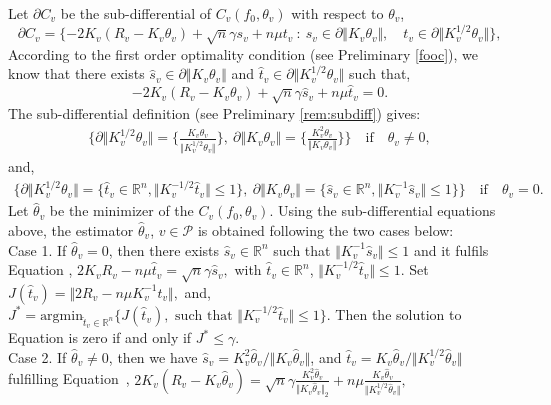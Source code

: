 Let $\partial C_{v}$ be the sub-differential of $C_{v}(f_0,\theta_v)$ with respect to $\theta_v$,
\begin{equation*}
\partial C_v=\{-2K_v(R_v-K_v\theta_v)+\sqrt{n}\gamma s_v+n\mu t_v\: :\: s_v\in\partial\Vert K_v\theta_v\Vert,\quad t_v\in\partial\Vert K_v^{1/2}\theta_v\Vert\},
\end{equation*} 
According to the first order optimality condition (see Preliminary \ref{fooc}), we know that there exists $\widehat{s}_v\in\partial\Vert K_v\theta_v\Vert$ and $\widehat{t}_v\in\partial\Vert K_v^{1/2}\theta_v\Vert$ such that, 
\begin{equation}
\label{foprgs}
-2K_v(R_v-K_v\theta_v)+\sqrt{n}\gamma\widehat{s}_v+n\mu\widehat{t}_v=0.
\end{equation}
The sub-differential definition (see Preliminary \ref{rem:subdiff}) gives: 
\begin{align*}
\{\partial\Vert K_v^{1/2}\theta_v\Vert= \{\frac{K_v\theta_v}{\Vert K_v^{1/2}\theta_v\Vert}\},\:\partial\Vert K_v\theta_v\Vert= \{\frac{K_v^2\theta_v}{\Vert K_v\theta_v\Vert}\}\}\quad \text{if}\quad \theta_v\neq 0,
\end{align*}
and,
\begin{align*}
 \{\partial\Vert K_v^{1/2}\theta_v\Vert=\{\widehat{t}_v\in\mathbb{R}^n,\Vert K_v^{-1/2}\widehat{t}_v\Vert\leq 1\},\:\partial\Vert K_v\theta_v\Vert=\{\widehat{s}_v\in\mathbb{R}^n,\Vert K_v^{-1} \widehat{s}_v\Vert\leq 1\}\}\quad \text{if}\quad \theta_v=0.
\end{align*}
Let $\widehat{\theta}_v$ be the minimizer of the $C_v(f_0,\theta_v)$.
Using the sub-differential equations above, the estimator $\widehat{\theta}_v$, $v\in\mathcal{P}$ is obtained following the two cases below:\\ 
Case 1. If $\widehat{\theta}_v=0$, then there exists $\widehat{s}_v\in\mathbb{R}^n$ such that $\Vert K_v^{-1}\widehat{s}_v\Vert\leq 1$ and it fulfils Equation , $2K_vR_v-n\mu \widehat{t}_v=\sqrt{n}\gamma \widehat{s}_v,$ 
with $\widehat{t}_v\in\mathbb{R}^n$, $\Vert K_v^{-1/2}\widehat{t}_v\Vert\leq 1$. Set $J(\widehat{t}_v)=\Vert 2R_v-n\mu K_v^{-1}\widehat{t}_v\Vert,$ and, 
$J^*=\text{argmin}_{\widehat{t}_v\in\mathbb{R}^n}\{J(\widehat{t}_v),\text{ such that }\Vert K_v^{-1/2}\widehat{t}_v\Vert\leq 1\}.$ 
Then the solution to Equation  is zero if and only if $J^*\leq\gamma$.\\
Case 2. If $\widehat{\theta}_v\neq0$, then we have $\widehat{s}_v=K_v^2\widehat{\theta}_v/\Vert K_v\widehat{\theta}_v\Vert$, and $\widehat{t}_v=K_v\widehat{\theta}_v/\Vert K_v^{1/2}\widehat{\theta}_v\Vert$ fulfilling Equation~, $2K_v(R_v-K_v\widehat{\theta}_v)=\sqrt{n}\gamma\frac{K_v^2\widehat{\theta}_v}{\Vert K_v\widehat{\theta}_v\Vert_2}+n\mu\frac{K_v\widehat{\theta}_v}{\Vert K_v^{1/2}\widehat{\theta}_v\Vert},$ 
